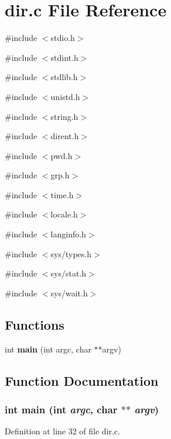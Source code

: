 \section{dir.c File Reference}
\label{dir_8c}
{\ttfamily \#include $<$stdio.h$>$}\par
{\ttfamily \#include $<$stdint.h$>$}\par
{\ttfamily \#include $<$stdlib.h$>$}\par
{\ttfamily \#include $<$unistd.h$>$}\par
{\ttfamily \#include $<$string.h$>$}\par
{\ttfamily \#include $<$dirent.h$>$}\par
{\ttfamily \#include $<$pwd.h$>$}\par
{\ttfamily \#include $<$grp.h$>$}\par
{\ttfamily \#include $<$time.h$>$}\par
{\ttfamily \#include $<$locale.h$>$}\par
{\ttfamily \#include $<$langinfo.h$>$}\par
{\ttfamily \#include $<$sys/types.h$>$}\par
{\ttfamily \#include $<$sys/stat.h$>$}\par
{\ttfamily \#include $<$sys/wait.h$>$}\par
\subsection*{Functions}
\begin{DoxyCompactItemize}
\item 
int {\bf main} (int argc, char $\ast$$\ast$argv)
\end{DoxyCompactItemize}


\subsection{Function Documentation}
\subsubsection[{main}]{\setlength{\rightskip}{0pt plus 5cm}int main (int {\em argc}, \/  char $\ast$$\ast$ {\em argv})}\label{dir_8c_a3c04138a5bfe5d72780bb7e82a18e627}


Definition at line 32 of file dir.c.

